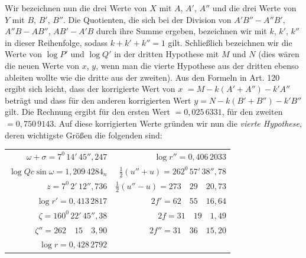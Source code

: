 Wir bezeichnen nun die drei Werte von $X$ mit $A$, $A'$, $A''$ und die drei Werte von $Y$
mit $B$, $B'$, $B''$. Die Quotienten, die sich bei der Division von $A'B''-A''B'$, $A''B-AB''$,
$AB'-A'B$ durch ihre Summe ergeben, bezeichnen wir mit $k$, $k'$, $k''$ in dieser Reihenfolge, sodass $k+k'+k''=1$ gilt. Schließlich bezeichnen wir die Werte von $\log P'$ und $\log Q'$ in der dritten
Hypothese mit $M$ und $N$ (dies wären die neuen Werte von $x$, $y$, wenn man die vierte
Hypothese aus der dritten ebenso ableiten wollte wie die dritte aus
der zweiten). Aus den Formeln in Art. 120 ergibt sich leicht, dass der korrigierte Wert von $x$
$=M-k(A'+A'')-k'A''$ beträgt und dass für den anderen korrigierten Wert $y = N-k(B'+B'')-k'B''$ gilt.
Die Rechnung ergibt für den ersten Wert $=0{,}025\,6331$, für den zweiten $=0{,}750\,9143$. Auf diese korrigierten Werte gründen wir nun die \emph{vierte Hypothese}, deren wichtigste Größen die folgenden sind:
\begin{center}\begingroup\footnotesize\setlength{\tabcolsep}{3pt}\renewcommand{\arraystretch}{1.3}
\begin{tabular}{r|r}
$\omega + \sigma=7^0\,14'\,45''{,}247$ & $\log r''=0{,}406\,2033$\\
$\log Qc\sin\omega=1{,}209\,4284_n$ & $\tfrac12(u''+u)=262^0\,57'\,38''{,}78$\\
$z=7^0\,2'\,12''{,}736$ & $\tfrac12(u''-u)=273\quad29\quad20{,}73$\\
$\log r'=0{,}413\,2817$ & $2f'=62\quad55\quad16{,}64$\\
$\zeta=160^0\,22'\,45''{,}38$ & $2f=31\quad19\quad1{,}49$\\
$\zeta''=262\quad15\quad3{,}90$ & $2f''=31\quad36\quad15{,}20$\\
$\log r=0{,}428\,2792$ & \\
\end{tabular}
\endgroup\end{center}

